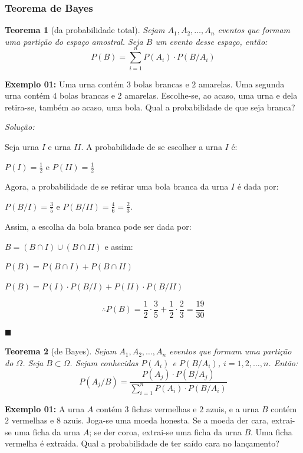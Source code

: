 \documentclass[oneside,a4paper,12pt]{article}
\newtheorem{theorem}{Teorema}[section]
\begin{document}
\subsubsection{Teorema de Bayes}

\begin{theorem}[da probabilidade total]
	Sejam $A_1, A_2, \dots, A_n$ eventos que formam uma partição do espaço amostral. Seja $B$ um evento desse espaço, então:
	$$P(B) = \sum_{i=1}^{n}P(A_i)\cdot P(B/A_i)$$
\end{theorem}

{\bf Exemplo 01:} Uma urna contém $3$ bolas brancas e $2$ amarelas. Uma segunda urna contém $4$ bolas brancas e $2$ amarelas. Escolhe-se, ao acaso, uma urna e dela retira-se, também ao acaso, uma bola. Qual a probabilidade de que seja branca?

{\it Solução:}


Seja urna $I$ e urna $II$. A probabilidade de se escolher a urna $I$ é:

$P(I) = \displaystyle \frac{1}{2}$ e $P(II) = \displaystyle \frac{1}{2}$

Agora, a probabilidade de se retirar uma bola branca da urna $I$ é dada por:

$P(B/I) = \displaystyle \frac{3}{5}$ e $P(B/II) = \displaystyle \frac{4}{6} = \displaystyle \frac{2}{3}$.

Assim, a escolha da bola branca pode ser dada por:

$B = (B \cap I) \cup (B \cap II)$ e assim:

$P(B) = P(B \cap I) + P(B \cap II)$

$P(B) = P(I)\cdot P(B/I) + P(II)\cdot P(B/II)$ 

$$\therefore P(B) = \frac{1}{2}\cdot \frac{3}{5} + \frac{1}{2}\cdot \frac{2}{3} = \frac{19}{30}$$

\begin{flushright}
	$\blacksquare$
\end{flushright}

\begin{theorem}[de Bayes]
	Sejam $A_1,A_2,\dots,A_n$ eventos que formam uma partição do $\Omega$. Seja $B \subset \Omega$. Sejam conhecidas $P(A_i)$ e $P(B/A_i)$, $i = 1,2,\dots,n$. Então:
	$$P(A_j/B) = \frac{P(A_j)\cdot P(B/A_j)}{\displaystyle \sum_{i=1}^{n}P(A_i)\cdot P(B/A_i)}$$
\end{theorem}

{\bf Exemplo 01:} A urna $A$ contém $3$ fichas vermelhas e $2$ azuis, e a urna $B$ contém $2$ vermelhas e $8$ azuis. Joga-se uma moeda honesta. Se a moeda der cara, extrai-se uma ficha da urna $A$; se der coroa, extrai-se uma ficha da urna $B$. Uma ficha vermelha é extraída. Qual a probabilidade de ter saído cara no lançamento?
\end{document}
